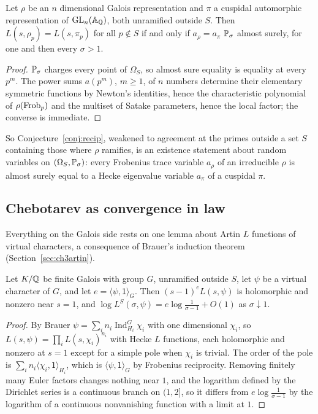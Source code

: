 \begin{proposition}\label{prop:recipas}
Let $\rho$ be an $n$ dimensional Galois representation and $\pi$ a cuspidal automorphic representation of $\mathrm{GL}_n(\mathbb{A}_{\mathbb{Q}})$, both unramified outside $S$. Then $L(s,\rho_p)=L(s,\pi_p)$ for all $p\notin S$ if and only if $a_\rho=a_\pi$ $\mathbb{P}_\sigma$ almost surely, for one and then every $\sigma>1$.
\end{proposition}

\begin{proof}
$\mathbb{P}_\sigma$ charges every point of $\Omega_S$, so almost sure equality is equality at every $p^m$. The power sums $a(p^m)$, $m\ge1$, of $n$ numbers determine their elementary symmetric functions by Newton's identities, hence the characteristic polynomial of $\rho(\operatorname{Frob}_p)$ and the multiset of Satake parameters, hence the local factor; the converse is immediate.
\end{proof}

So Conjecture~\ref{conj:recip}, weakened to agreement at the primes outside a set $S$ containing those where $\rho$ ramifies, is an existence statement about random variables on $(\Omega_S,\mathbb{P}_\sigma)$: every Frobenius trace variable $a_\rho$ of an irreducible $\rho$ is almost surely equal to a Hecke eigenvalue variable $a_\pi$ of a cuspidal $\pi$.

\subsection{Chebotarev as convergence in law}

Everything on the Galois side rests on one lemma about Artin $L$ functions of virtual characters, a consequence of Brauer's induction theorem (Section~\ref{sec:ch3artin}).

\begin{lemma}\label{lem:recipvirtual}
Let $K/\mathbb{Q}$ be finite Galois with group $G$, unramified outside $S$, let $\psi$ be a virtual character of $G$, and let $e=\langle\psi,\mathsf{1}\rangle_G$. Then $(s-1)^eL(s,\psi)$ is holomorphic and nonzero near $s=1$, and $\log L^S(\sigma,\psi)=e\log\frac1{\sigma-1}+O(1)$ as $\sigma\downarrow1$.
\end{lemma}

\begin{proof}
By Brauer $\psi=\sum_in_i\operatorname{Ind}_{H_i}^G\chi_i$ with one dimensional $\chi_i$, so $L(s,\psi)=\prod_iL(s,\chi_i)^{n_i}$ with Hecke $L$ functions, each holomorphic and nonzero at $s=1$ except for a simple pole when $\chi_i$ is trivial. The order of the pole is $\sum_in_i\langle\chi_i,\mathsf{1}\rangle_{H_i}$, which is $\langle\psi,\mathsf{1}\rangle_G$ by Frobenius reciprocity. Removing finitely many Euler factors changes nothing near $1$, and the logarithm defined by the Dirichlet series is a continuous branch on $(1,2]$, so it differs from $e\log\frac1{\sigma-1}$ by the logarithm of a continuous nonvanishing function with a limit at $1$.
\end{proof}

